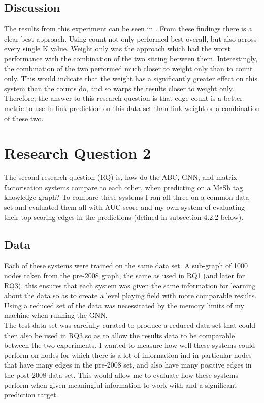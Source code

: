 \documentclass{l4proj}
\begin{document}
\subsection{Discussion}

The results from this experiment can be seen in . From these findings there is a clear best approach. Using count not only performed best overall, but also across every single K value. Weight only was the approach which had the worst performance with the combination of the two sitting between them. Interestingly, the combination of the two performed much closer to weight only than to count only. This would indicate that the weight has a significantly greater effect on this system than the counts do, and so warps the results closer to weight only. \\ 

Therefore, the answer to this research question is that edge count is a better metric to use in link prediction on this data set than link weight or a combination of these two. \\

\section{Research Question 2}

The second research question (RQ) is, how do the ABC, GNN, and matrix factorisation systems compare to each other, when predicting on a MeSh tag knowledge graph? To compare these systems I ran all three on a common data set and evaluated them all with AUC score and my own system of evaluating their top scoring edges in the predictions (defined in subsection 4.2.2 below). \\

\subsection{Data}

Each of these systems were trained on the same data set. A sub-graph of 1000 nodes taken from the pre-2008 graph, the same as used in RQ1 (and later for RQ3). this ensures that each system was given the same information for learning about the data so as to create a level playing field with more comparable results. Using a reduced set of the data was necessitated by the memory limits of my machine when running the GNN. \\

The test data set was carefully curated to produce a reduced data set that could then also be used in RQ3 so as to allow the results data to be comparable between the two experiments. I wanted to measure how well these systems could perform on nodes for which there is a lot of information ind in particular nodes that have many edges in the pre-2008 set, and also have many positive edges in the post-2008 data set. This would allow me to evaluate how these systems perform when given meaningful information to work with and a significant prediction target. \\
\end{document}
